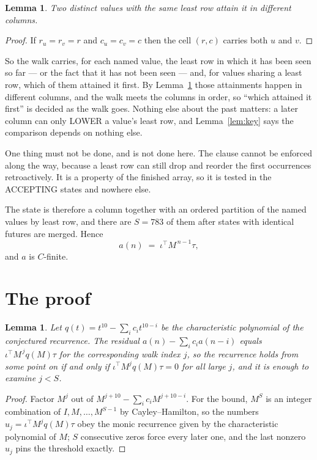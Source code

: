 \documentclass[11pt,a4paper]{article}
\theoremstyle{plain}
\newtheorem{lemma}[theorem]{Lemma}
\theoremstyle{definition}
\begin{document}
\begin{lemma}\label{lem:tie}
Two distinct values with the same least row attain it in different columns.
\end{lemma}

\begin{proof}
If $r_u=r_v=r$ and $c_u=c_v=c$ then the cell $(r,c)$ carries both $u$ and $v$.
\end{proof}

So the walk carries, for each named value, the least row in which it has been seen so far ---
or the fact that it has not been seen --- and, for values sharing a least row, which of them
attained it first. By Lemma~\ref{lem:tie} those attainments happen in different columns, and
the walk meets the columns in order, so ``which attained it first'' is decided as the walk
goes. Nothing else about the past matters: a later column can only LOWER a value's least row,
and Lemma~\ref{lem:key} says the comparison depends on nothing else.

One thing must not be done, and is not done here. The clause cannot be enforced along the way,
because a least row can still drop and reorder the first occurrences retroactively. It is a
property of the finished array, so it is tested in the ACCEPTING states and nowhere else.

The state is therefore a column together with an ordered partition of the named values by least
row, and there are $S=783$ of them after states with identical futures are merged. Hence
\[
a(n)\;=\;\iota^{\!\top}M^{\,n-1}\tau,
\]
and $a$ is $C$-finite.

\section{The proof}

\begin{lemma}\label{lem:crit}
Let $q(t)=t^{10}-\sum_i c_it^{10-i}$ be the characteristic polynomial of the
conjectured recurrence. The residual $a(n)-\sum_ic_ia(n-i)$ equals
$\iota^{\!\top}M^{\,j}q(M)\tau$ for the corresponding walk index $j$, so the recurrence
holds from some point on if and only if $\iota^{\!\top}M^{j}q(M)\tau=0$ for all large $j$,
and it is enough to examine $j<S$.
\end{lemma}

\begin{proof}
Factor $M^{j}$ out of $M^{j+10}-\sum_ic_iM^{j+10-i}$. For the bound, $M^{S}$
is an integer combination of $I,M,\dots,M^{S-1}$ by Cayley--Hamilton, so the numbers
$u_j=\iota^{\!\top}M^{j}q(M)\tau$ obey the monic recurrence given by the characteristic
polynomial of $M$; $S$ consecutive zeros force every later one, and the last nonzero $u_j$
pins the threshold exactly.
\end{proof}
\end{document}
